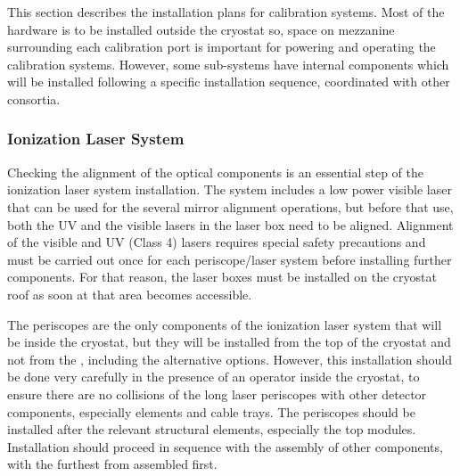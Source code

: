 



This section describes the installation plans for calibration systems. Most of the hardware is to be installed outside the cryostat so, space on mezzanine surrounding each calibration port is important for powering and operating the calibration systems. However, some sub-systems have internal components which will be installed %
following a specific installation sequence, coordinated with other consortia.

\subsubsection{Ionization Laser System} 
 
Checking the alignment of the optical components is an essential step of the ionization laser system installation. The system includes a low power visible laser that can be used for the several mirror alignment operations, but before that use, both the UV and the visible lasers in the laser box need to be aligned.
Alignment of the visible and UV (Class 4) lasers requires special safety precautions and must be carried out once for each periscope/laser system before installing further  components. For that reason, the laser boxes must be installed on the cryostat roof as soon at that area becomes accessible.  
 
The periscopes are the only components of the ionization laser system that will be inside the cryostat, but they will be installed from the top of the cryostat and not from the , including the alternative options. However, this installation should be done very carefully in the presence of an operator inside the cryostat, to ensure there are no collisions of the long laser periscopes with other detector components, especially  elements and  cable trays.
The periscopes should be installed after the relevant structural elements, especially the top  modules. Installation should proceed in sequence with the assembly of other components, with the furthest from  assembled first.

